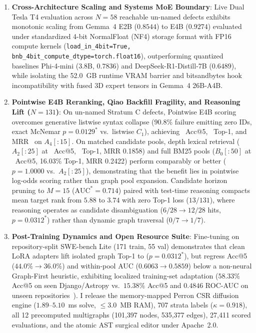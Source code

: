 \documentclass[10pt]{article}
\begin{document}
\begin{enumerate}[noitemsep,topsep=1pt,parsep=0pt,partopsep=0pt]
    \item \textbf{Cross-Architecture Scaling and Systems MoE Boundary}: Live Dual Tesla T4 evaluation across $N=58$ reachable un-named defects exhibits monotonic scaling from Gemma~4 E2B ($0.8544$) to E4B ($0.9274$) evaluated under standardized 4-bit NormalFloat (NF4) storage format with FP16 compute kernels (\texttt{load\_in\_4bit=True, bnb\_4bit\_compute\_dtype=torch.float16}), outperforming quantized baselines Phi-4-mini (3.8B, $0.7836$) and DeepSeek-R1-Distill-7B ($0.6489$), while isolating the 52.0~GB runtime VRAM barrier and bitsandbytes hook incompatibility with fused 3D expert tensors in Gemma~4 26B-A4B.
    \item \textbf{Pointwise E4B Reranking, Qiao Backfill Fragility, and Reasoning Lift ($N=131$)}: On un-named Stratum C defects, Pointwise E4B scoring overcomes generative listwise syntax collapse ($90.8\%$ failure emitting zero IDs, exact McNemar $p=0.0129^*$ vs.\ listwise $C_1$), achieving \HonestEFourBAFourFifteenAccFive\ Acc@5, \HonestEFourBAFourFifteenTopOne\ Top-1, and MRR \HonestEFourBAFourFifteenMRR\ on $A_4[:15]$. On matched candidate pools, depth lexical retrieval ($A_2[:25]$ at \HonestEFourBATwoTwentyFiveAccFive\ Acc@5, \HonestEFourBATwoTwentyFiveTopOne\ Top-1, MRR 0.1858) and full BM25 pools ($B_0[:50]$ at \HonestEFourBBZeroFiftyAccFive\ Acc@5, 16.03\% Top-1, MRR 0.2422) perform comparably or better ($p=1.0000$ vs.\ $A_2[:25]$), demonstrating that the benefit lies in pointwise log-odds scoring rather than graph pool expansion. Candidate horizon pruning to $M=15$ ($\text{AUC}^*=0.714$) paired with test-time reasoning compacts mean target rank from $5.88$ to $3.74$ with zero Top-1 loss ($13/131$), where reasoning operates as candidate disambiguation ($6/28 \to 12/28$ hits, $p=0.0312^*$) rather than dynamic graph traversal ($0/7 \to 1/7$).
    \item \textbf{Post-Training Dynamics and Open Resource Suite}: Fine-tuning on repository-split SWE-bench Lite (171 train, 55 val) demonstrates that clean LoRA adapters lift isolated graph Top-1 to \textbf{\LoraGenPostAccOne} ($p = 0.0312^*$), but regress Acc@5 ($44.0\% \to 36.0\%$) and within-pool AUC ($0.6063 \to 0.5859$) below a non-neural Graph-First heuristic, exhibiting localized training-set adaptation ($58.33\%$ Acc@5 on seen Django/Astropy vs.\ $15.38\%$ Acc@5 and $0.4846$ ROC-AUC on unseen repositories~\cite{biderman2024lora}). I release the memory-mapped Perron CSR diffusion engine ($1.89\text{--}5.10$~ms solve, $\le 3.0$~MB RAM), 707 strata labels ($\kappa=0.918$), all 12 precomputed multigraphs (101,397 nodes, 535,377 edges), 27,411 scored evaluations, and the atomic AST surgical editor under Apache~2.0.
\end{enumerate}
\end{document}
